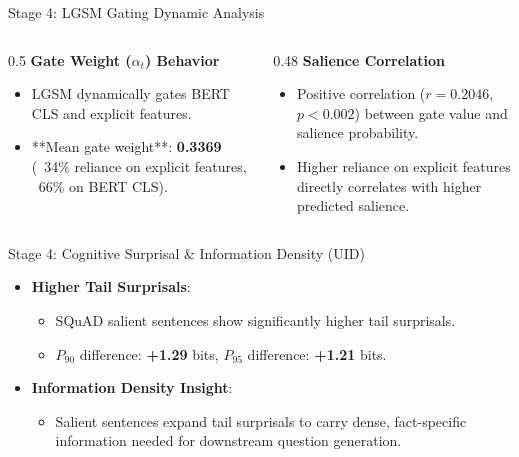 \documentclass[aspectratio=169]{beamer}
\begin{document}
\begin{frame}{Stage 4: LGSM Gating Dynamic Analysis}
    \begin{columns}
        \begin{column}{0.5\textwidth}
            \textbf{Gate Weight ($\alpha_t$) Behavior}
            \begin{itemize}
                \item LGSM dynamically gates BERT CLS and explicit features.
                \item **Mean gate weight**: \textbf{0.3369} (~34\% reliance on explicit features, ~66\% on BERT CLS).
            \end{itemize}
        \end{column}
        
        \begin{column}{0.48\textwidth}
            \textbf{Salience Correlation}
            \begin{itemize}
                \item Positive correlation ($r = 0.2046$, $p < 0.002$) between gate value and salience probability.
                \item Higher reliance on explicit features directly correlates with higher predicted salience.
            \end{itemize}
        \end{column}
    \end{columns}
\end{frame}

\begin{frame}{Stage 4: Cognitive Surprisal \& Information Density (UID)}
    \begin{itemize}
        \item \textbf{Higher Tail Surprisals}:
            \begin{itemize}
                \item SQuAD salient sentences show significantly higher tail surprisals.
                \item $P_{90}$ difference: \textbf{+1.29} bits, $P_{95}$ difference: \textbf{+1.21} bits.
            \end{itemize}
        \vspace{0.4cm}
        \item \textbf{Information Density Insight}:
            \begin{itemize}
                \item Salient sentences expand tail surprisals to carry dense, fact-specific information needed for downstream question generation.
            \end{itemize}
    \end{itemize}
\end{frame}
\end{document}
